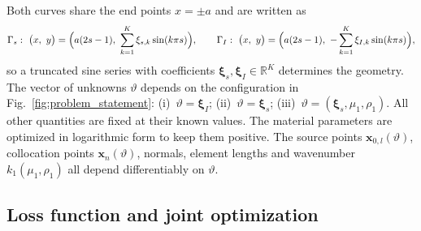 \documentclass[11pt,twoside]{article}
\begin{document}
Both curves share the end points $x=\pm a$ and are written as
\begin{equation}\label{eq:shape}
  \Gamma_s:\ \bigl(x,\ y\bigr) = \Bigl(a(2s-1),\ \sum_{k=1}^{K}\xi_{s,k}\sin(k\pi s)\Bigr),
  \qquad
  \Gamma_I:\ \bigl(x,\ y\bigr) = \Bigl(a(2s-1),\ -\sum_{k=1}^{K}\xi_{I,k}\sin(k\pi s)\Bigr),
\end{equation}
so a truncated sine series with coefficients
$\boldsymbol{\xi}_s,\boldsymbol{\xi}_I\in\mathbb{R}^K$ determines the geometry.
The vector of unknowns $\vartheta$ depends on the configuration in
Fig.~\ref{fig:problem_statement}:
(i)~$\vartheta = \boldsymbol{\xi}_I$;
(ii)~$\vartheta = \boldsymbol{\xi}_s$;
(iii)~$\vartheta = (\boldsymbol{\xi}_s,\mu_1,\rho_1)$.
All other quantities are fixed at their known values. The material parameters
are optimized in logarithmic form to keep them positive. The source points
$\mathbf{x}_{0,l}(\vartheta)$, collocation points $\mathbf{x}_n(\vartheta)$,
normals, element lengths and wavenumber $k_1(\mu_1,\rho_1)$ all depend
differentiably on $\vartheta$.

\subsection{Loss function and joint optimization}
\end{document}
